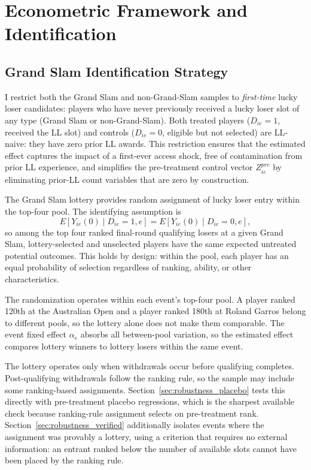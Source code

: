 \section{Econometric Framework and Identification}
\label{sec:strategy}

\subsection{Grand Slam Identification Strategy}
\label{sec:strategy_gs}

I restrict both the Grand Slam and non-Grand-Slam samples to \textit{first-time} lucky loser candidates: players who have never previously received a lucky loser slot of any type (Grand Slam or non-Grand-Slam). Both treated players ($D_{ie} = 1$, received the LL slot) and controls ($D_{ie} = 0$, eligible but not selected) are LL-naive: they have zero prior LL awards. This restriction ensures that the estimated effect captures the impact of a first-ever access shock, free of contamination from prior LL experience, and simplifies the pre-treatment control vector $Z^{pre}_{ie}$ by eliminating prior-LL count variables that are zero by construction.

The Grand Slam lottery provides random assignment of lucky loser entry within the top-four pool. The identifying assumption is
\[
E[Y_{ie}(0) \mid D_{ie}=1, e] = E[Y_{ie}(0) \mid D_{ie}=0, e],
\]
so among the top four ranked final-round qualifying losers at a given Grand Slam, lottery-selected and unselected players have the same expected untreated potential outcomes. This holds by design: within the pool, each player has an equal probability of selection regardless of ranking, ability, or other characteristics.

The randomization operates within each event's top-four pool. A player ranked 120th at the Australian Open and a player ranked 180th at Roland Garros belong to different pools, so the lottery alone does not make them comparable. The event fixed effect $\alpha_e$ absorbs all between-pool variation, so the estimated effect compares lottery winners to lottery losers within the same event.

The lottery operates only when withdrawals occur before qualifying completes. Post-qualifying withdrawals follow the ranking rule, so the sample may include some ranking-based assignments. Section~\ref{sec:robustness_placebo} tests this directly with pre-treatment placebo regressions, which is the sharpest available check because ranking-rule assignment selects on pre-treatment rank. Section~\ref{sec:robustness_verified} additionally isolates events where the assignment was provably a lottery, using a criterion that requires no external information: an entrant ranked below the number of available slots cannot have been placed by the ranking rule.


